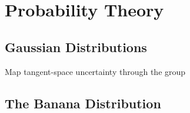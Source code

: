
\chapter{Probability Theory}

\section{Gaussian Distributions}

Map tangent-space uncertainty through the group

\section{The Banana Distribution}

